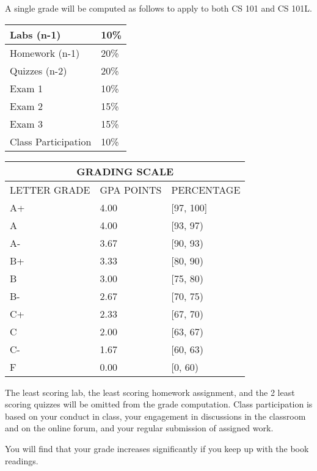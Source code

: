 \documentclass[a4paper]{article}
\begin{document}
A single grade will be computed as follows to apply to both CS 101 and CS 101L.\\
\begin{tabular}{|l|l|}
\hline
Labs (n-1) & 10\% \\\hline
Homework (n-1) & 20\% \\\hline
Quizzes (n-2) &	20\% \\\hline
Exam 1 & 10\%\\\hline
Exam 2 & 15\%\\\hline
Exam 3 & 15\%\\\hline
Class Participation & 10\%\\\hline
\end{tabular}
\begin{tabular}{|l|l|l|}
  \hline
  \multicolumn{3}{|c|}{\bf GRADING SCALE}\\\hline
  LETTER GRADE & GPA POINTS & PERCENTAGE\\\hline
  A+ & 4.00 & [97, 100] \\\hline
  A & 4.00 & [93, 97) \\\hline
  A- & 3.67 & [90, 93) \\\hline
  B+ & 3.33 & [80, 90) \\\hline
  B & 3.00 & [75, 80) \\\hline
  B- & 2.67 & [70, 75) \\\hline
  C+ & 2.33 & [67, 70) \\\hline
  C & 2.00 & [63, 67) \\\hline
  C- & 1.67 & [60, 63) \\\hline
  F & 0.00 & [0, 60)\\\hline
\end{tabular}

The least scoring lab, the least scoring homework assignment, and the 2 least scoring quizzes will be omitted from the grade computation. Class participation is based on your conduct in class, your engagement in discussions in the classroom and on the online forum, and your regular submission of assigned work.

You will find that your grade increases significantly if you keep up with the book readings.\smallskip

\end{document}
